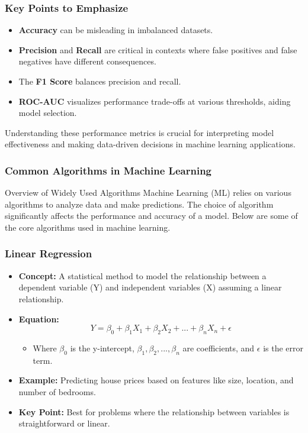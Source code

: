 \documentclass[aspectratio=169]{beamer}
\begin{document}
\begin{frame}[fragile]
    \frametitle{Key Points to Emphasize}
    \begin{itemize}
        \item \textbf{Accuracy} can be misleading in imbalanced datasets.
        \item \textbf{Precision} and \textbf{Recall} are critical in contexts where false positives and false negatives have different consequences.
        \item The \textbf{F1 Score} balances precision and recall.
        \item \textbf{ROC-AUC} visualizes performance trade-offs at various thresholds, aiding model selection.
    \end{itemize}
    
    Understanding these performance metrics is crucial for interpreting model effectiveness and making data-driven decisions in machine learning applications.
\end{frame}

\begin{frame}[fragile]
    \frametitle{Common Algorithms in Machine Learning}
    \begin{block}{Overview of Widely Used Algorithms}
        Machine Learning (ML) relies on various algorithms to analyze data and make predictions. The choice of algorithm significantly affects the performance and accuracy of a model. Below are some of the core algorithms used in machine learning.
    \end{block}
\end{frame}

\begin{frame}[fragile]
    \frametitle{Linear Regression}
    \begin{itemize}
        \item \textbf{Concept:} A statistical method to model the relationship between a dependent variable (Y) and independent variables (X) assuming a linear relationship.
        \item \textbf{Equation:} 
        \begin{equation}
            Y = \beta_0 + \beta_1X_1 + \beta_2X_2 + ... + \beta_nX_n + \epsilon
        \end{equation}
        \begin{itemize}
            \item Where $\beta_0$ is the y-intercept, $\beta_1, \beta_2, ..., \beta_n$ are coefficients, and $\epsilon$ is the error term.
        \end{itemize}
        \item \textbf{Example:} Predicting house prices based on features like size, location, and number of bedrooms.
        \item \textbf{Key Point:} Best for problems where the relationship between variables is straightforward or linear.
    \end{itemize}
\end{frame}
\end{document}
